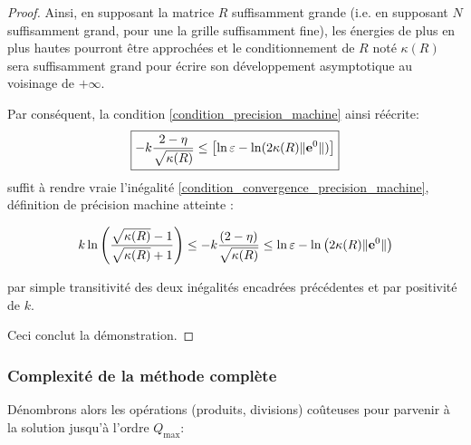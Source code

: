 \documentclass[svgnames,dvipsnames,a4paper,10pt,french]{report}
\begin{document}
\begin{proof}
Ainsi, en supposant la matrice $R$ suffisamment grande (i.e. en supposant $N$ suffisamment grand, pour une la grille suffisamment fine), les énergies de plus en plus hautes pourront être approchées et le conditionnement de $R$ noté $\kappa(R)$ sera suffisamment grand pour écrire son développement asymptotique au voisinage de $+\infty$.


Par conséquent, la condition \ref{condition_precision_machine} ainsi réécrite:
\begin{equation*}
    \boxed{- k\frac{2-\eta}{\sqrt{\kappa (R)}} \le \left[\ln \varepsilon - \ln (2 \kappa (R) \| \mathbf{e}^0\|) \right]}
\end{equation*}
suffit à rendre vraie l'inégalité \ref{condition_convergence_precision_machine}, définition de \og précision machine atteinte \fg{}:

\begin{equation*}
    k \ln \left( \frac{\sqrt{\kappa (R)} - 1}{\sqrt{\kappa (R)} + 1} \right)   \le -k \frac{(2-\eta)}{\sqrt{\kappa (R)}}  \le \ln \varepsilon -  \ln \left(2 \kappa (R) \| \mathbf{e}^0\| \right)
\end{equation*}

par simple transitivité des deux inégalités encadrées précédentes et par positivité de $k$. 

Ceci conclut la démonstration.
\end{proof}









\subsubsection{Complexité de la méthode complète}

Dénombrons alors les opérations (produits, divisions) coûteuses pour parvenir à la solution jusqu'à l'ordre $Q_\text{max}$:
\end{document}
